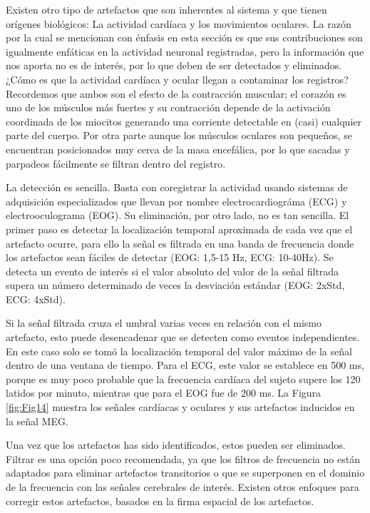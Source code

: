 \documentclass[11pt,letterpaper]{article}
\numberwithin{equation}{subsection}
\numberwithin{table}{subsection}
\begin{document}
\smallskip
\noindent Existen otro tipo de artefactos que son inherentes al sistema y que tienen orígenes biológicos: La actividad cardíaca y los movimientos oculares. La razón por la cual se mencionan con énfasis en esta sección es que sus contribuciones son igualmente enfáticas en la actividad neuronal registradas, pero la información que nos aporta no es de interés, por lo que deben de ser detectados y eliminados. ¿Cómo es que la actividad cardíaca 
y ocular llegan a contaminar los registros? Recordemos que ambos son el efecto de la contracción muscular; el corazón es uno de los músculos más fuertes y su contracción depende de la activación coordinada de los miocitos generando una corriente detectable en (casi) cualquier parte del cuerpo. Por otra parte aunque los músculos oculares son pequeños, se encuentran posicionados muy cerca de la masa encefálica, por lo que sacadas y parpadeos fácilmente se filtran dentro del registro.  

\bigskip
\noindent La detección es sencilla. Basta con coregistrar la actividad usando sistemas de adquisición especializados que llevan por nombre electrocardiográma (ECG) y electrooculograma (EOG). Su eliminación, por otro lado, no es tan sencilla. El primer paso es detectar la localización temporal aproximada de cada vez que el artefacto ocurre, para ello la señal es filtrada en una banda de frecuencia donde los artefactos sean fáciles de detectar (EOG: 1,5-15 Hz, ECG: 10-40Hz). Se detecta un evento de interés si el valor absoluto del valor de la señal filtrada supera un número determinado de veces la desviación estándar (EOG: 2xStd, ECG: 4xStd).

\bigskip
\noindent Si la señal filtrada cruza el umbral varias veces en relación con el mismo artefacto, esto puede desencadenar que se detecten como eventos independientes. En este caso solo se tomó la localización temporal del valor máximo de la señal dentro de una ventana de tiempo. Para el ECG, este valor se establece en 500 ms, porque es muy poco probable que la frecuencia cardíaca del sujeto supere los 120 latidos por minuto, mientras que para el EOG fue de 200 ms. La Figura \ref{fig:Fig14} muestra los señales cardíacas y oculares y sus artefactos inducidos en la señal MEG. 

\bigskip
\noindent Una vez que los artefactos has sido identificados, estos pueden ser eliminados. Filtrar es una opción poco recomendada, ya que los filtros de frecuencia no están adaptados para eliminar artefactos transitorios o que se superponen en el dominio de la frecuencia con las señales cerebrales de interés. Existen otros enfoques para corregir estos artefactos, basados en la firma espacial de los artefactos.
\end{document}
